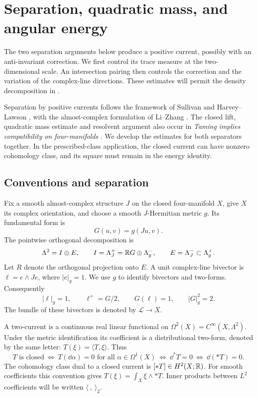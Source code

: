 \section{Separation, quadratic mass, and angular energy}
\label{sec:current-energy}

The two separation arguments below produce a positive current, possibly with
an anti-invariant correction.  We first control its trace measure at the
two-dimensional scale.  An intersection pairing then controls the correction
and the variation of the complex-line directions.  These estimates will
permit the density decomposition in .

Separation by positive currents follows the framework of Sullivan and
Harvey--Lawson \cite{Sullivan1976,HarveyLawson1983}, with the
almost-complex formulation of Li--Zhang
\cite[Section~3]{LiZhang2009}. The closed lift,
quadratic mass estimate and resolvent argument also occur in
\emph{Taming implies compatibility on four-manifolds}
\cite[Sections~2--4]{OpenAITaming2026}. We develop the estimates for
both separators together. In the prescribed-class application, the
closed current can have nonzero cohomology class, and its square must
remain in the energy identity.

\subsection{Conventions and separation}

Fix a smooth almost-complex structure $J$ on the closed four-manifold $X$,
give $X$ its complex orientation, and choose a smooth $J$-Hermitian metric
$g$.  Its fundamental form is
\[
 G(u,v)=g(Ju,v).
\]
The pointwise orthogonal decomposition is
\begin{equation}\label{eq:current-bundles}
 \Lambda^2=I\oplus E,
 \qquad I=\Lambda_J^+=\mathbb R G\oplus\Lambda_g^-,
 \qquad E=\Lambda_J^-\subset\Lambda_g^+.
\end{equation}
Let $R$ denote the orthogonal projection onto $E$.  A unit complex-line
bivector is $\ell=e\wedge Je$, where $|e|_g=1$.  We use $g$ to identify
bivectors and two-forms.  Consequently
\begin{equation}\label{eq:current-line-normalization}
 |\ell|_g=1,\qquad \ell^+=G/2,\qquad G(\ell)=1,
 \qquad |G|_g^2=2.
\end{equation}
The bundle of these bivectors is denoted by $\mathcal L\longrightarrow X$.

A two-current is a continuous real linear functional on
$\Omega^2(X)=C^\infty(X,\Lambda^2)$.  Under the metric identification its
coefficient is a distributional two-form, denoted by the same letter:
$T(\xi)=\langle T,\xi\rangle$.  Thus
\begin{equation}\label{eq:current-dual-convention}
 T\text{ is closed}\ \Longleftrightarrow\
 T(\dd\alpha)=0\text{ for all }\alpha\in\Omega^1(X)
 \ \Longleftrightarrow\ \dd^*T=0
 \ \Longleftrightarrow\ \dd(*T)=0.
\end{equation}
The cohomology class dual to a closed current is $[*T]\in H^2(X;\mathbb R)$.
For smooth coefficients this convention gives
$T(\xi)=\int_X\xi\wedge *T$.  Inner products between $L^2$ coefficients
will be written $\langle\ ,\ \rangle_2$.

